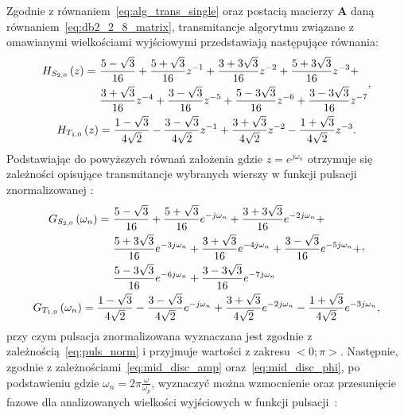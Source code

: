 Zgodnie z równaniem~\eqref{eq:alg_trans_single} oraz postacią macierzy $\mathbf{A}$ daną równaniem~\eqref{eq:db2_2_8_matrix}, transmitancje algorytmu związane z omawianymi wielkościami wyjściowymi przedstawiają następujące równania:
\begin{gather}
\begin{split}
H_{S_{2,0}} \left(z\right) = ~
& \frac{5 - \sqrt{3}}{16} + \frac{5 + \sqrt{3}}{16} z^{-1} + \frac{3 + 3 \sqrt{3}}{16} z^{-2} + \frac{5 + 3 \sqrt{3}}{16} z^{-3} + \\
& \frac{3 + \sqrt{3}}{16} z^{-4} + \frac{3 - \sqrt{3}}{16} z^{-5} + \frac{5 - 3 \sqrt{3}}{16} z^{-6} + \frac{3 - 3 \sqrt{3}}{16} z^{-7}
\end{split}
\label{eq:sym_partd_output_trans_z_S_2_0}, \\
H_{T_{1,0}} \left(z\right) = \frac{1 - \sqrt{3}}{4 \sqrt{2}} - \frac{3 - \sqrt{3}}{4 \sqrt{2}} z^{-1} + \frac{3 + \sqrt{3}}{4 \sqrt{2}} z^{-2} - \frac{1 + \sqrt{3}}{4 \sqrt{2}} z^{-3} \label{eq:sym_partd_output_trans_z_T_1_0}.
\end{gather}
Podstawiając do powyższych równań założenia gdzie $z = e^{j\omega_{n}}$ otrzymuje się zależności opisujące transmitancje wybranych wierszy w funkcji pulsacji znormalizowanej \cite{oppenheim_dsp}:
\begin{gather}
\begin{split}
G_{S_{2,0}} \left(\omega_{n}\right) = ~
& \frac{5 - \sqrt{3}}{16} + \frac{5 + \sqrt{3}}{16} e^{-j\omega_{n}} + \frac{3 + 3 \sqrt{3}}{16} e^{-2j\omega_{n}} + \\
& \frac{5 + 3 \sqrt{3}}{16} e^{-3j\omega_{n}} + \frac{3 + \sqrt{3}}{16} e^{-4j\omega_{n}} + \frac{3 - \sqrt{3}}{16} e^{-5j\omega_{n}} + \\
& \frac{5 - 3 \sqrt{3}}{16} e^{-6j\omega_{n}} + \frac{3 - 3 \sqrt{3}}{16} e^{-7j\omega_{n}}
\end{split}
\label{eq:sym_partd_output_trans_wn_S_2_0}, \\
G_{T_{1,0}} \left(\omega_{n}\right) = \frac{1 - \sqrt{3}}{4 \sqrt{2}} - \frac{3 - \sqrt{3}}{4 \sqrt{2}} e^{-j\omega_{n}} + \frac{3 + \sqrt{3}}{4 \sqrt{2}} e^{-2j\omega_{n}} - \frac{1 + \sqrt{3}}{4 \sqrt{2}} e^{-3j\omega_{n}} \label{eq:sym_partd_output_trans_wn_T_1_0},
\end{gather}
przy czym pulsacja znormalizowana wyznaczana jest zgodnie z zależnością~\eqref{eq:puls_norm} i przyjmuje wartości z zakresu $<0;\pi>$. Następnie, zgodnie z zależnościami~\eqref{eq:mid_disc_amp} oraz~\eqref{eq:mid_disc_phi}, po podstawieniu gdzie $\omega_{n} = 2\pi \frac{\omega}{\omega_{p}}$, wyznaczyć można wzmocnienie oraz przesunięcie fazowe dla analizowanych wielkości wyjściowych w funkcji pulsacji~\cite{proakis_dsp}:
